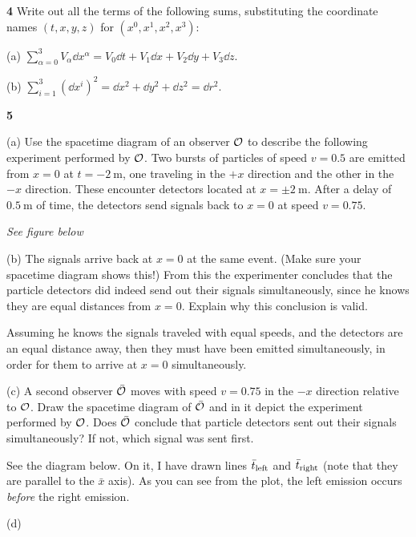 \documentclass[gr-notes.tex]{subfiles}
\begin{document}
\textbf{4}
Write out all the terms of the following sums, substituting the coordinate names $(t, x, y, z)$ for $(x^0, x^1, x^2, x^3)$:

(a)
$\sum_{\alpha=0}^3 V_\alpha \dd{x^\alpha} =
 V_0 \dd{t} + V_1 \dd{x} + V_2 \dd{y} + V_3 \dd{z}$.

(b)
$\sum_{i=1}^3 (\dd{x^i})^2 =
 \dd{x}^2 + \dd{y}^2 + \dd{z}^2 = \dd{r}^2$.


\textbf{5}

(a) Use the spacetime diagram of an observer $\mathcal{O}$ to describe the following experiment performed by $\mathcal{O}$. Two bursts of particles of speed $v = 0.5$ are emitted from $x = 0$ at $t = \SI{-2}{\meter}$, one traveling in the $+x$ direction and the other in the $-x$ direction. These encounter detectors located at $x = \pm\SI{2}{\meter}$. After a delay of $\SI{0.5}{\meter}$ of time, the detectors send signals back to $x = 0$ at speed $v = 0.75$.

\emph{See figure below}


(b) The signals arrive back at $x = 0$ at the same event. (Make sure your spacetime diagram shows this!) From this the experimenter concludes that the particle detectors did indeed send out their signals simultaneously, since he knows they are equal distances from $x = 0$. Explain why this conclusion is valid.

Assuming he knows the signals traveled with equal speeds, and the detectors are an equal distance away, then they must have been emitted simultaneously, in order for them to arrive at $x = 0$ simultaneously.


(c) A second observer $\bar{\mathcal{O}}$ moves with speed $v = 0.75$ in the $-x$ direction relative to $\mathcal{O}$. Draw the spacetime diagram of $\bar{\mathcal{O}}$ and in it depict the experiment performed by $\mathcal{O}$. Does $\bar{\mathcal{O}}$ conclude that particle detectors sent out their signals simultaneously? If not, which signal was sent first.

See the diagram below. On it, I have drawn lines $\bar{t}_{\rm left}$ and $\bar{t}_{\rm right}$ (note that they are parallel to the $\bar{x}$ axis). As you can see from the plot, the left emission occurs \emph{before} the right emission.


(d)
\end{document}
